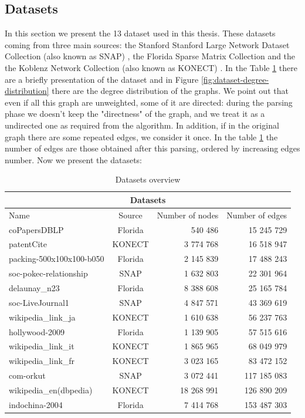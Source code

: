 \subsection{Datasets}\label{Dataset}
In this section we present the 13 dataset used in this thesis. These datasets coming from three main sources: the Stanford Stanford Large Network Dataset Collection (also known as SNAP) \cite{snap}, the Florida Sparse Matrix Collection \cite{florida-matrix} and the the Koblenz Network Collection (also known as KONECT)  \cite{konect}. In the Table \ref{tab:dataset} there are a briefly presentation of the dataset and in Figure \ref{fig:dataset-degree-distribution} there are the degree distribution of the graphs.  We point out that even if all this graph are unweighted, some of it are directed: during the parsing phase we doesn't keep the "directness" of the graph, and we treat it as a undirected one as required from the algorithm. In addition, if in the original graph there are some repeated edges, we consider it once. In the table \ref{tab:dataset} the number of edges are those obtained after this parsing, ordered by increasing edges number. Now we present the datasets:
\begin{table}
	\centering
	\begin{tabular}{ |l||c||r|r|}
		\hline
		\multicolumn{4}{|c|}{Datasets} \\
		\hline
		Name& Source &  Number of nodes  & Number of edges\\
		\hline
		coPapersDBLP & Florida  & 540 486    & 15 245 729\\
		patentCite & KONECT &3 774 768 & 16 518 947 \\
		packing-500x100x100-b050 & Florida & 2 145 839 & 17 488 243 \\
		soc-pokec-relationship & SNAP &1 632 803 & 22 301 964 \\ 
		delaunay\_n23 & Florida &8 388 608 & 25 165 784\\
		soc-LiveJournal1 & SNAP & 4 847 571 & 43 369 619 \\
		wikipedia\_link\_ja & KONECT & 1 610 638 & 56 237 763\\
		hollywood-2009 & Florida &1 139 905 & 57 515 616 \\
		wikipedia\_link\_it & KONECT & 1 865 965 & 68 049 979\\
		wikipedia\_link\_fr & KONECT & 3 023 165 & 83 472 152\\
		com-orkut & SNAP &3 072 441 &117 185 083\\
		wikipedia\_en(dbpedia) & KONECT & 18 268 991 & 126 890 209 \\
		indochina-2004 & Florida & 7 414 768 & 153 487 303 \\
		\hline
	\end{tabular}
	\caption{\label{tab:dataset}Datasets overview}
\end{table} 
